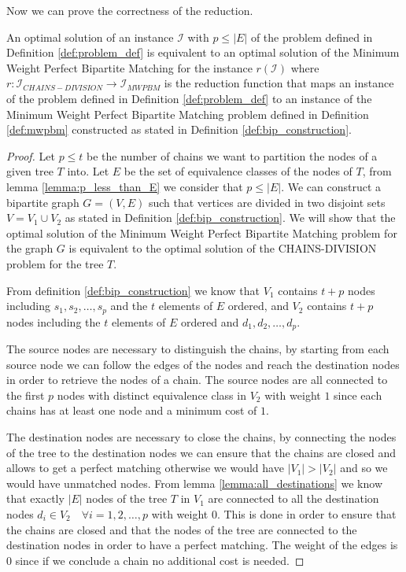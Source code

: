 Now we can prove the correctness of the reduction.

\begin{theorem}
    An optimal solution of an instance $\mathcal I$ with $p \leq |E|$ of the problem defined in Definition \ref{def:problem_def} is equivalent to an optimal solution of the Minimum Weight Perfect Bipartite Matching for the instance $r(\mathcal I)$ where $r: \mathcal{I}_{CHAINS-DIVISION} \rightarrow \mathcal{I}_{MWPBM}$ is the reduction function that maps an instance of the problem defined in Definition \ref{def:problem_def} to an instance of the Minimum Weight Perfect Bipartite Matching problem defined in Definition \ref{def:mwpbm} constructed as stated in Definition \ref{def:bip_construction}.
\end{theorem}

\begin{proof}
    Let $p \leq t$ be the number of chains we want to partition the nodes of a given tree $T$ into. Let $E$ be the set of equivalence classes of the nodes of $T$, from lemma \ref{lemma:p_less_than_E} we consider that $p \leq |E|$. We can construct a bipartite graph $G = (V, E)$ such that vertices are divided in two disjoint sets $V = V_1 \cup V_2$ as stated in Definition \ref{def:bip_construction}. We will show that the optimal solution of the Minimum Weight Perfect Bipartite Matching problem for the graph $G$ is equivalent to the optimal solution of the \textsc{CHAINS-DIVISION} problem for the tree $T$.

    From definition \ref{def:bip_construction} we know that $V_1$ contains $t + p$ nodes including $s_1, s_2, \dots, s_p$ and the $t$ elements of $E$ ordered, and $V_2$ contains $t + p$ nodes including the $t$ elements of $E$ ordered and $d_1, d_2, \dots, d_p$.

    The source nodes are necessary to distinguish the chains, by starting from each source node we can follow the edges of the nodes and reach the destination nodes in order to retrieve the nodes of a chain. The source nodes are all connected to the first $p$ nodes with distinct equivalence class in $V_2$ with weight $1$ since each chains has at least one node and a minimum cost of $1$.

    The destination nodes are necessary to close the chains, by connecting the nodes of the tree to the destination nodes we can ensure that the chains are closed and allows to get a perfect matching otherwise we would have $|V_1| > |V_2|$ and so we would have unmatched nodes. From lemma \ref{lemma:all_destinations} we know that exactly $|E|$ nodes of the tree $T$ in $V_1$ are connected to all the destination nodes $d_i \in V_2 \quad \forall i = 1, 2, \dots, p$ with weight $0$. This is done in order to ensure that the chains are closed and that the nodes of the tree are connected to the destination nodes in order to have a perfect matching. The weight of the edges is $0$ since if we conclude a chain no additional cost is needed.


\end{proof}
